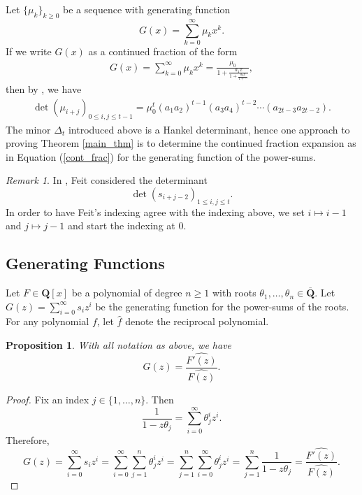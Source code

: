\documentclass{amsart}
\newcommand{\Q}{\mathbf{Q}}
\theoremstyle{plain}
\newtheorem{prop}[equation]{Proposition}
\theoremstyle{remark}
\newtheorem{rmk}[equation]{Remark}
\begin{document}
Let $\lbrace \mu_k \rbrace_{k \geq 0}$ be a sequence with generating function
\[
G(x) =  \sum_{k=0}^\infty \mu_kx^k.
\]
If we write $G(x)$ as a continued fraction of the form
\begin{align} \label{cont_frac}
G(x) = \sum_{k=0}^\infty \mu_kx^k  = \frac{\mu_0}{\displaystyle 1+  \frac{a_1x}{1+ \displaystyle \frac{a_2x}{1 + \cdots}}},
\end{align}
then by \cite[Thm.~30]{krattenhaler}, we have
\begin{align} \label{kratt_form}
\det \left( \mu_{i+j} \right)_{0 \leq i,j \leq t-1} = \mu_0^t \left( a_1a_2 \right)^{t-1}\left(a_3a_4 \right)^{t-2} \cdots \left(a_{2t-3}a_{2t-2}\right).
\end{align}
The minor $\Delta_{t}$ introduced above is a Hankel determinant, hence one approach to proving Theorem \ref{main_thm} is to determine the continued fraction expansion as in Equation (\ref{cont_frac}) for the generating function of the power-sums.

\begin{rmk}
In \cite{feit}, Feit considered the determinant 
\[
\det \left(s_{i+j-2} \right)_{1 \leq i,j \leq t}.
\]
In order to have Feit's indexing agree with the indexing above, we set $i \mapsto i-1$ and $j \mapsto j-1$ and start the indexing at 0.
\end{rmk}

\subsection{Generating Functions}

Let $F \in \Q[x]$ be a polynomial of degree $n \geq 1$ with roots $\theta_1,\dots,\theta_n \in \overline{\Q}$.  Let $G(z) = \sum_{i=0}^\infty s_iz^i$ be the generating function for the power-sums of the roots.  For any polynomial $f$, let $\widehat{f}$ denote the reciprocal polynomial.

\begin{prop} \label{G_deriv_prop}
With all notation as above, we have
\[
G(z) = \frac{\widehat{F'(z)}}{\widehat{F(z)}}.
\]
\end{prop}

\begin{proof}
Fix an index $j \in \lbrace 1,\dots,n \rbrace$.  Then
\[
\frac{1}{1-z\theta_j} = \sum_{i=0}^\infty \theta_j^iz^i.
\]
Therefore, 
\[
G(z) = \sum_{i=0}^\infty s_iz^i = \sum_{i=0}^\infty \sum_{j=1}^n \theta_j^i z^i = \sum_{j=1}^n \sum_{i=0}^\infty \theta_j^iz^i= \sum_{j=1}^n \frac{1}{1-z\theta_j} =  \frac{\widehat{F'(z)}}{\widehat{F(z)}}.
\]
\end{proof}
\end{document}
